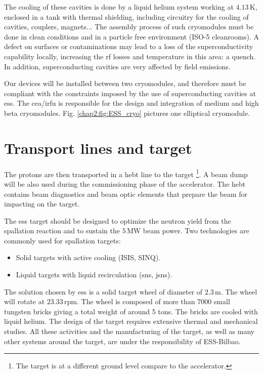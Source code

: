\begin{refsection}
  The cooling of these cavities is done by a liquid helium system working at $4.13\,\mathrm{K}$, enclosed in a tank with thermal shielding, including circuitry for the cooling of cavities, couplers, magnets... The assembly process of such cryomodules must be done in clean conditions and in a particle free environment (ISO-5 cleanrooms). A defect on surfaces or contaminations may lead to a loss of the superconductivity capability locally, increasing the \acrshort{rf} losses and temperature in this area: a quench.
  In addition, superconducting cavities are very affected by field emissions.

  Our devices will be installed between two cryomodules, and therefore must be compliant with the constraints imposed by the use of superconducting cavities at \acrshort{ess}. The \acrshort{cea}/\acrshort{irfu} is responsible for the design and integration of medium and high beta cryomodules. Fig. \ref{chap2:fig:ESS_cryo} pictures one elliptical cryomodule.

  

  \section{Transport lines and target}
  The protons are then transported in a \acrfull{hebt} line to the target \footnote{The target is at a different ground level compare to the accelerator.}. A beam dump will be also used during the commissioning phase of the accelerator. The \acrshort{hebt} contains beam diagnostics and beam optic elements that prepare the beam for impacting on the target.

  The \acrshort{ess} target should be designed to optimize the neutron yield from the spallation reaction and to sustain the $5\,\mathrm{MW}$ beam power. Two technologies are commonly used for spallation targets:
  \begin{itemize}
    \item Solid targets with active cooling (ISIS, SINQ).
    \item Liquid targets with liquid recirculation (\acrshort{sns}, \acrshort{jsns}).
  \end{itemize}
  The solution chosen by \acrshort{ess} is a solid target wheel of diameter of $2.3\,\mathrm{m}$. The wheel will rotate at $23.33\,\mathrm{rpm}$. The wheel is composed of more than $7000$ small tungsten bricks giving a total weight of around 5 tons. The bricks are cooled with liquid helium. The design of the target requires extensive thermal and mechanical studies. All these activities and the manufacturing of the target, as well as many other systems around the target, are under the responsibility of ESS-Bilbao.


\end{refsection}
